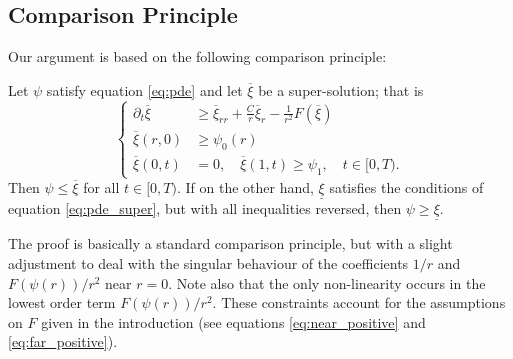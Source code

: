 \documentclass{amsart}
\begin{document}
\subsection{Comparison Principle}

Our argument is based on the following comparison principle:

\begin{thm}
Let \(\psi\) satisfy equation \eqref{eq:pde} and let \(\overline{\xi}\) be a super-solution; that is
\begin{equation}
\label{eq:pde_super}
\begin{cases}
\partial_t \overline{\xi} &\geq \overline{\xi}_{rr} + \frac{C}{r} \overline{\xi}_r - \frac{1}{r^2} F(\overline{\xi}) \\
\overline{\xi}(r, 0) &\geq \psi_0(r) \\
\overline{\xi}(0, t) &= 0, \quad \overline{\xi}(1, t) \geq \psi_1, \quad t \in [0, T).
\end{cases}
\end{equation}
Then \(\psi \leq \overline{\xi}\) for all \(t \in [0, T)\). If on the other hand, \(\underline{\xi}\) satisfies the conditions of equation \eqref{eq:pde_super}, but with all inequalities reversed, then \(\psi \geq \underline{\xi}\).
\end{thm}

The proof is basically a standard comparison principle, but with a slight adjustment to deal with the singular behaviour of the coefficients \(1/r\) and \(F(\psi(r))/r^2\) near \(r=0\). Note also that the only non-linearity occurs in the lowest order term \(F(\psi(r))/r^2\). These constraints account for the assumptions on \(F\) given in the introduction (see equations \eqref{eq:near_positive} and \eqref{eq:far_positive}).
\end{document}
